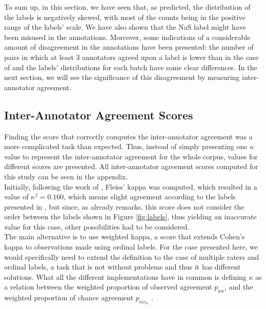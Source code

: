 To sum up, in this section, we have seen that, as predicted, the distribution of the labels is negatively skewed, with most of the counts being in the positive range of the labels' scale. We have also shown that the NaS label might have been misused in the annotations. Moreover, some indications of a considerable amount of disagreement in the annotations have been presented: the number of pairs in which at least 3 annotators agreed upon a label is lower than in the case of \citet{de2012did} and the labels' distributions for each batch have some clear differences. In the next section, we will see the significance of this disagreement by measuring inter-annotator agreement.\\ 

\subsection{Inter-Annotator Agreement Scores}

Finding the score that correctly computes the inter-annotator agreement was a more complicated task than expected. Thus, instead of simply presenting one $\kappa$ value to represent the inter-annotator agreement for the whole corpus, values for different scores are presented. All inter-annotator agreement scores computed for this study can be seen in the appendix.\\

Initially, following the work of \citet{de2012did}, Fleiss' kappa \citep{fleiss1971measuring} was computed, which resulted in a value of $\kappa^{f} = 0.160$, which means slight agreement according to the labels presented in \citet{shrout1998measurement}, but since, as \citet{de2012did} already remarks, this score does not consider the order between the labels shown in Figure \ref{fig:labels}, thus yielding an inaccurate value for this case, other possibilities had to be considered.\\

The main alternative is to use weighted kappa, a score that extends Cohen's kappa \citep{cohen1960coefficient} to observations made using ordinal labels. For the case presented here, we would specifically need to extend the definition to the case of multiple raters and ordinal labels, a task that is not without problems \citep{berry2008weighted,nelson2015measures} and thus it has different solutions. What all the different implementations have in common is defining $\kappa$ as a relation between the weighted proportion of observed agreement $p_{aw}$, and the weighted proportion of chance agreement $p_{a|c_w}$ \citep{vanacore2022robustness}.\\

